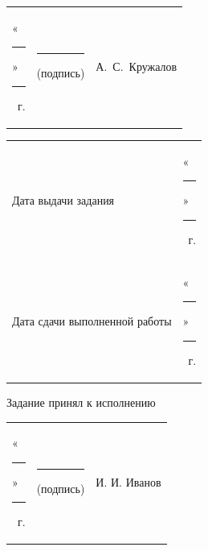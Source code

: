 \documentclass[14pt, a4paper]{extarticle}
\begin{document}
{
\renewcommand{\arraystretch}{2}
\noindent
\begin{tabularx}{\textwidth}{@{} P{0.45\textwidth} P{0.3\textwidth} P{0.25\textwidth} @{}}

    «\rule{0.8cm}{0.4pt}» \quad \rule{2cm}{0.4pt} ~г. &
    \centering \rule{3.5cm}{0.4pt} \par \footnotesize (подпись) &
    \hfill А.~С.~Кружалов                                         \\
\end{tabularx}

\begin{tabularx}{\textwidth}{@{} P{0.45\textwidth} P{0.55\textwidth} @{}}
    Дата выдачи задания           &
    \hfill «\rule{0.8cm}{0.4pt}» \quad \rule{2cm}{0.4pt} ~г. \\

    Дата сдачи выполненной работы &
    \hfill «\rule{0.8cm}{0.4pt}» \quad \rule{2cm}{0.4pt} ~г. \\
\end{tabularx}
}

Задание принял к исполнению

{
\renewcommand{\arraystretch}{1.5}
\begin{tabularx}{\textwidth}{@{} P{0.45\textwidth} P{0.3\textwidth} P{0.25\textwidth} @{}}

    «\rule{0.8cm}{0.4pt}» \quad \rule{2cm}{0.4pt} ~г. &
    \centering \rule{3.5cm}{0.4pt} \par \footnotesize (подпись) &
    \hfill И. И. Иванов                                            \\
\end{tabularx}
}
\end{document}
